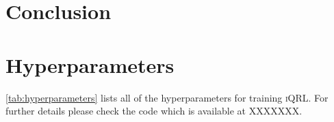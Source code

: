 \documentclass{article}
\theoremstyle{plain}
\theoremstyle{definition}
\theoremstyle{remark}
\newcommand{\our}{\textsc{iQRL}\xspace}
\begin{document}







\section{Conclusion}
\label{conclusion}






\newpage
\appendix
\onecolumn

\section{Hyperparameters}
\cref{tab:hyperparameters} lists all of the hyperparameters for training \our.
For further details please check the code which is available at XXXXXXX.
\end{document}
